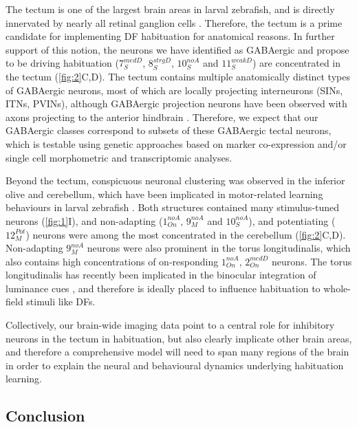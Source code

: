\documentclass[9pt,lineno]{RandlettLab_elife}
\begin{document}
The tectum is one of the largest brain areas in larval zebrafish, and is directly innervated by nearly all retinal ganglion cells \citep{Robles2014-kz}. Therefore, the tectum is a prime candidate for implementing DF habituation for anatomical reasons. In further support of this notion, the neurons we have identified as GABAergic and propose to be driving habituation ($7_{S}^{medD}$, $8_{S}^{strgD}$,  $10_{S}^{noA}$ and $11_{S}^{weakD}$) are concentrated in the tectum (\autoref{fig:2}C,D). The tectum contains multiple anatomically distinct types of GABAergic neurons, most of which are locally projecting interneurons (SINs, ITNs, PVINs), although GABAergic projection neurons have been observed with axons projecting to the anterior hindbrain \citep{Gebhardt2019-xd, Martin2022-iz, Nevin2010-ev, Robles2011-ty}. Therefore, we expect that our GABAergic classes correspond to subsets of these GABAergic tectal neurons, which is testable using genetic approaches based on marker co-expression and/or single cell morphometric and transcriptomic analyses.

Beyond the tectum, conspicuous neuronal clustering was observed in the inferior olive and cerebellum, which have been implicated in motor-related learning behaviours in larval zebrafish \citep{Ahrens2012-zb, Lin2020-dv, Markov2021-rd}. Both structures contained many stimulus-tuned neurons (\autoref{fig:1}I), and non-adapting ($1_{On}^{noA}$,  $9_{M}^{noA}$ and $10_{S}^{noA}$), and potentiating ($12_{M}^{Pot}$) neurons were among the most concentrated in the cerebellum (\autoref{fig:2}C,D). Non-adapting $9_{M}^{noA}$ neurons were also prominent in the torus longitudinalis, which also contains high concentrations of on-responding $1_{On}^{noA}$, $2_{On}^{medD}$ neurons. The torus longitudinalis has recently been implicated in the binocular integration of luminance cues \citep{Tesmer2022-tk}, and therefore is ideally placed to influence habituation to whole-field stimuli like DFs. 

Collectively, our brain-wide imaging data point to a central role for inhibitory neurons in the tectum in habituation, but also clearly implicate other brain areas, and therefore a comprehensive model will need to span many regions of the brain in order to explain the neural and behavioural dynamics underlying habituation learning. 

\subsection{Conclusion}
\end{document}
